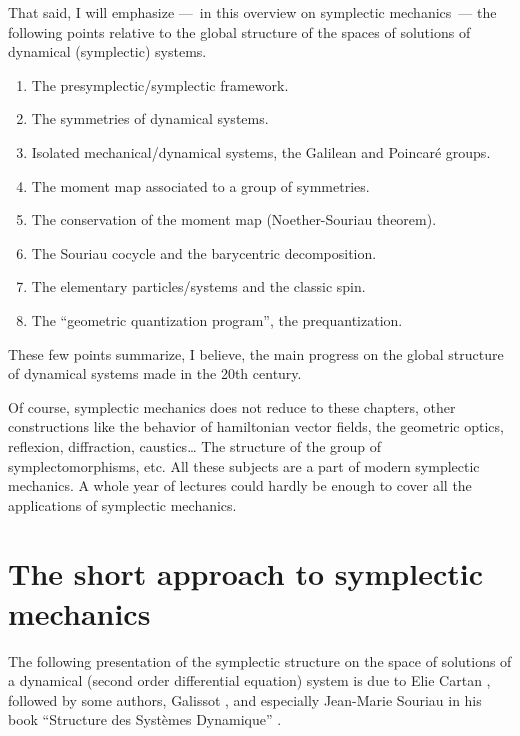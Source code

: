 That said,
I will emphasize
---~in this overview on symplectic mechanics~---
the following points relative to the global structure of the spaces of solutions of dynamical (symplectic) systems.

\begin{enumerate}
  \item The presymplectic/symplectic framework.
  \item The symmetries of dynamical systems.
  \item Isolated mechanical/dynamical systems, the Galilean and Poincaré groups.
  \item The moment map associated to a group of symmetries.
  \item The conservation of the moment map (Noether-Souriau theorem).
  \item The Souriau cocycle and the barycentric decomposition.
  \item The elementary particles/systems and the classic spin.
  \item The ``geometric quantization program'', the prequantization.
\end{enumerate}

These few points summarize,
I believe,
the main progress on the global structure of dynamical systems made in the 20th century.

Of course,
symplectic mechanics does not reduce to these chapters,
other constructions like the behavior of hamiltonian vector fields,
the geometric optics,
reflexion,
diffraction,
caustics\dots
The structure of the group of symplectomorphisms,
etc.
All these subjects are a part of modern symplectic mechanics.
A whole year of lectures could hardly be enough to cover all the applications of symplectic mechanics.


\section{The short approach to symplectic mechanics}

The following presentation of the symplectic structure on the space of solutions of a dynamical (second order differential equation) system is due to Elie Cartan \cite{Car22},
followed by some authors,
Galissot \cite{Gal52},
and especially Jean-Marie Souriau in his book ``Structure des Systèmes Dynamique'' \cite{Sou70}.

